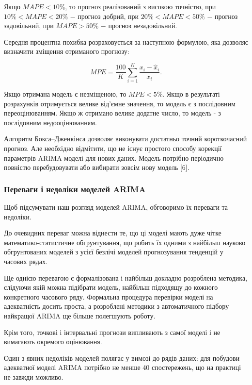 \vspace{1.5em}

Якщо $MAPE < 10 \%$, то прогноз реалізований з високою точністю, при $10\%<MAPE<20\%$ $-$ прогноз добрий, при $20\%<MAPE<50\%$ $-$ прогноз задовільний, при $MAPE>50\%$ $-$ прогноз незадовільний.

Середня процентна похибка розраховується за наступною формулою, яка дозволяє визначити зміщення отриманого прогнозу:

\begin{equation}\label{eq:MPE}
MPE = \frac{100}{K}\sum_{i=1}^{K}\frac{x_{i} - \hat{x}_{i}}{x_{i}}.
\end{equation}

\vspace{1.5em}

Якщо отримана модель є незміщеною, то $MPE < 5\%$. Якщо в результаті розрахунків отримується велике від’ємне значення, то модель є з послідовним переоцінюванням. Якщо ж отримано велике додатне число, то модель - з послідовним недооцінюванням. 

Алгоритм Бокса–Дженкінса дозволяє виконувати достатньо точний короткочасний прогноз. Але необхідно відмітити, що не існує простого способу корекції параметрів ARIMA моделі для нових даних. Модель потрібно періодично повністю перебудовувати або вибирати зовсім нову модель [6]. 
\newpage

\subsubsection{Переваги і недоліки моделей ARIMA}

Щоб підсумувати наш розгляд моделей ARIMA, обговоримо їх переваги та недоліки.

До очевидних переваг можна віднести те, що ці моделі мають дуже чітке математико-статистичне обгрунтування, що робить їх одними з найбільш науково обгрунтованих моделей з усієї безлічі моделей прогнозування тенденцій у часових рядах.

Ще однією перевагою є формалізована і найбільш докладно розроблена методика, слідуючи якій можна підібрати модель, найбільш підходящу до кожного конкретного часового ряду. Формальна процедура перевірки моделі на адекватність досить проста, а розроблені методики з автоматичного підбору найкращої ARIMA ще більше полегшують роботу.

Крім того, точкові і інтервальні прогнози випливають з самої моделі і не вимагають окремого оцінювання.

Один з явних недоліків моделей полягає у вимозі до рядів даних: для побудови адекватної моделі ARIMA потрібно не менше 40 спостережень, що на практиці не завжди можливо.

